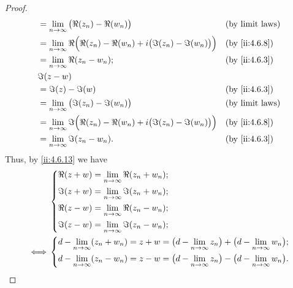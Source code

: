 \begin{proof}
\begin{align*}
     & = \lim_{n \to \infty} \big(\Re(z_n) - \Re(w_n)\big)                                      &  & \text{(by limit laws)} \\
     & = \lim_{n \to \infty} \Re\Big(\Re(z_n) - \Re(w_n) + i \big(\Im(z_n) - \Im(w_n)\big)\Big) &  & \by{ii:4.6.8}          \\
     & = \lim_{n \to \infty} \Re(z_n - w_n);                                                    &  & \by{ii:4.6.3}          \\
     & \Im(z - w)                                                                                                           \\
     & = \Im(z) - \Im(w)                                                                        &  & \by{ii:4.6.3}          \\
     & = \lim_{n \to \infty} \big(\Im(z_n) - \Im(w_n)\big)                                      &  & \text{(by limit laws)} \\
     & = \lim_{n \to \infty} \Im\Big(\Re(z_n) - \Re(w_n) + i \big(\Im(z_n) - \Im(w_n)\big)\Big) &  & \by{ii:4.6.8}          \\
     & = \lim_{n \to \infty} \Im(z_n - w_n).                                                    &  & \by{ii:4.6.3}          \\
  \end{align*}
  Thus, by \cref{ii:4.6.13} we have
  \begin{align*}
         & \begin{dcases}
             \Re(z + w) = \lim_{n \to \infty} \Re(z_n + w_n); \\
             \Im(z + w) = \lim_{n \to \infty} \Im(z_n + w_n); \\
             \Re(z - w) = \lim_{n \to \infty} \Re(z_n - w_n); \\
             \Im(z - w) = \lim_{n \to \infty} \Im(z_n - w_n);
           \end{dcases}                                                                             \\
    \iff & \begin{dcases}
             d - \lim_{n \to \infty} (z_n + w_n) = z + w = \big(d - \lim_{n \to \infty} z_n\big) + \big(d - \lim_{n \to \infty} w_n\big); \\
             d - \lim_{n \to \infty} (z_n - w_n) = z - w = \big(d - \lim_{n \to \infty} z_n\big) - \big(d - \lim_{n \to \infty} w_n\big).
           \end{dcases}
  \end{align*}


\end{proof}
